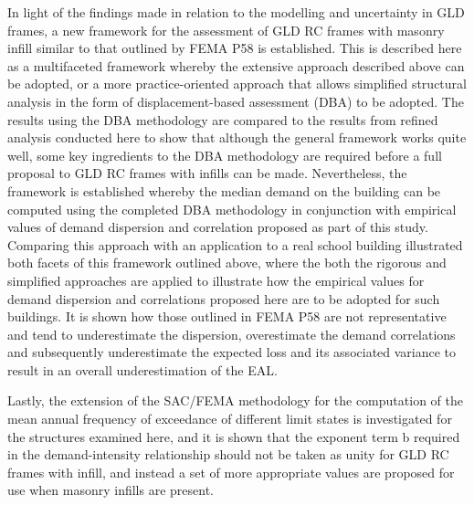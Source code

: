 In light of the findings made in relation to the modelling and uncertainty in GLD frames, a new framework for the assessment of GLD RC frames with masonry infill similar to that outlined by FEMA P58 is established. This is described here as a multifaceted framework whereby the extensive approach described above can be adopted, or a more practice-oriented approach that allows simplified structural analysis in the form of displacement-based assessment (DBA) to be adopted. The results using the DBA methodology are compared to the results from refined analysis conducted here to show that although the general framework works quite well, some key ingredients to the DBA methodology are required before a full proposal to GLD RC frames with infills can be made. Nevertheless, the framework is established whereby the median demand on the building can be computed using the completed DBA methodology in conjunction with empirical values of demand dispersion and correlation proposed as part of this study. Comparing this approach with an application to a real school building illustrated both facets of this framework outlined above, where the both the rigorous and simplified approaches are applied to illustrate how the empirical values for demand dispersion and correlations proposed here are to be adopted for such buildings. It is shown how those outlined in FEMA P58 are not representative and tend to underestimate the dispersion, overestimate the demand correlations and subsequently underestimate the expected loss and its associated variance to result in an overall underestimation of the EAL. 

Lastly, the extension of the SAC/FEMA methodology for the computation of the mean annual frequency of exceedance of different limit states is investigated for the structures examined here, and it is shown that the exponent term b required in the demand-intensity relationship should not be taken as unity for GLD RC frames with infill, and instead a set of more appropriate values are proposed for use when masonry infills are present. 
